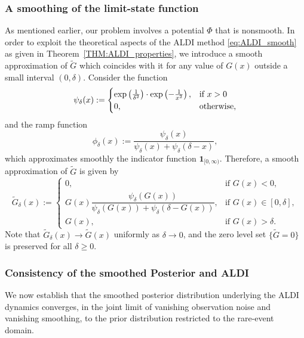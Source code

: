 \documentclass[a4paper]{article}
\numberwithin{equation}{section}
\begin{document}
\subsubsection{A smoothing of the limit-state function}\label{subsubsec:smooth}
As mentioned earlier, our problem involves a potential $\Phi$ that is nonsmooth. In order to exploit the theoretical aspects of the ALDI method \eqref{eq:ALDI_smooth} as given in Theorem~\ref{THM:ALDI_properties}, we introduce a smooth approximation of $\tilde{G}$ which coincides with it for any value of $G(x)$ outside a small interval $(0,\delta)$. Consider the function
\begin{equation}
\label{eq:psi_base}
\psi_\delta(x):=\begin{cases}
\exp\left(\frac{1}{\delta^2}\right)\cdot \exp\left(-\frac{1}{x^2}\right), & \textup{if }
x> 0\\
0, & \textup{otherwise}, \end{cases}
\end{equation}
and the ramp function
\begin{equation}
    \label{eq:ramp_function}
\phi_\delta(x):=\frac{\psi_\delta(x)}{\psi_\delta(x)+ \psi_\delta(\delta-x)},
\end{equation}
which approximates smoothly the indicator function $\mathbf{1}_{[0,\infty)}$. Therefore, a smooth approximation of $\tilde{G}$ is given by
\begin{equation}
    \label{eq:smooth_G}
\tilde G_\delta(x) :=
\begin{cases}
  0, & \text{if } G(x) < 0,\\[0.3em]
  G(x)\dfrac{\psi_\delta(G(x))}{\psi_\delta(G(x))+\psi_\delta(\delta-G(x))}, & \text{if } G(x)\in[0,\delta],\\[0.7em]
  G(x), & \text{if } G(x) > \delta.
\end{cases}
\end{equation}
Note that $\tilde G_\delta(x)\to\tilde G(x)$ uniformly as $\delta\to0$, and the zero level set $\{\tilde{G}=0\}$ is preserved for all $\delta\geq0$. 


\subsubsection{Consistency of the smoothed Posterior and ALDI}
\label{SUBSUBSEC:consistency}
We now establish that the smoothed posterior distribution underlying the ALDI dynamics 
converges, in the joint limit of vanishing observation noise and vanishing smoothing, 
to the prior distribution restricted to the rare-event domain.
\end{document}
